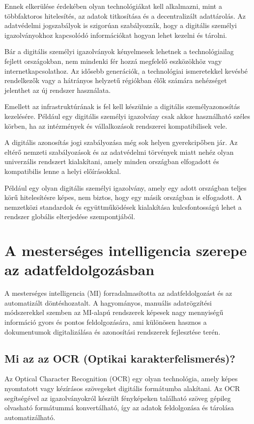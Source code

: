 \documentclass[
]{thesis-ekf}
\theoremstyle{definition}
\theoremstyle{remark}
\begin{document}
	Ennek elkerülése érdekében olyan technológiákat kell alkalmazni, mint a többfaktoros hitelesítés, az adatok titkosítása és a decentralizált adattárolás. Az adatvédelmi jogszabályok is szigorúan szabályozzák, hogy a digitális személyi igazolványokhoz kapcsolódó információkat hogyan lehet kezelni és tárolni.

	Bár a digitális személyi igazolványok kényelmesek lehetnek a technológiailag fejlett országokban, nem mindenki fér hozzá megfelelő eszközökhöz vagy internetkapcsolathoz. Az idősebb generációk, a technológiai ismeretekkel kevésbé rendelkezők vagy a hátrányos helyzetű régiókban élők számára nehézséget jelenthet az új rendszer használata.
	
	Emellett az infrastruktúrának is fel kell készülnie a digitális személyazonosítás kezelésére. Például egy digitális személyi igazolvány csak akkor használható széles körben, ha az intézmények és vállalkozások rendszerei kompatibilisek vele.

	A digitális azonosítás jogi szabályozása még sok helyen gyerekcipőben jár. Az eltérő nemzeti szabályozások és az adatvédelmi törvények miatt nehéz olyan univerzális rendszert kialakítani, amely minden országban elfogadott és kompatibilis lenne a helyi előírásokkal.
	
	Például egy olyan digitális személyi igazolvány, amely egy adott országban teljes körű hitelesítésre képes, nem biztos, hogy egy másik országban is elfogadott. A nemzetközi standardok és együttműködések kialakítása kulcsfontosságú lehet a rendszer globális elterjedése szempontjából.
	
	\chapter{A mesterséges intelligencia szerepe az adatfeldolgozásban}
	A mesterséges intelligencia (MI) forradalmasította az adatfeldolgozást és az automatizált döntéshozatalt. A hagyományos, manuális adatrögzítési módszerekkel szemben az MI-alapú rendszerek képesek nagy mennyiségű információ gyors és pontos feldolgozására, ami különösen hasznos a dokumentumok digitalizálása és azonosítási rendszerek fejlesztése terén.
	
	\section{Mi az az OCR (Optikai karakterfelismerés)?}
	Az Optical Character Recognition (OCR) egy olyan technológia, amely képes nyomtatott vagy kézírásos szövegeket digitális formátumba alakítani. Az OCR segítségével az igazolványokról készült fényképeken található szöveg gépileg olvasható formátummá konvertálható, így az adatok feldolgozása és tárolása automatizálható.
	
\end{document}
